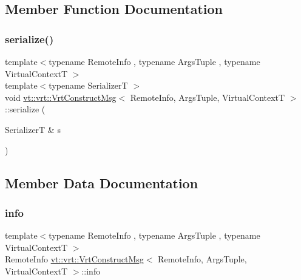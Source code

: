 \subsection{Member Function Documentation}
\mbox{\label{structvt_1_1vrt_1_1_vrt_construct_msg_af6ed1200b682487df4fc1d2faf86aa02}} 
\subsubsection{\texorpdfstring{serialize()}{serialize()}}
{\footnotesize\ttfamily template$<$typename Remote\+Info , typename Args\+Tuple , typename Virtual\+ContextT $>$ \\
template$<$typename SerializerT $>$ \\
void \hyperlink{structvt_1_1vrt_1_1_vrt_construct_msg}{vt\+::vrt\+::\+Vrt\+Construct\+Msg}$<$ Remote\+Info, Args\+Tuple, Virtual\+ContextT $>$\+::serialize (\begin{DoxyParamCaption}\item[{SerializerT \&}]{s }\end{DoxyParamCaption})\hspace{0.3cm}{\ttfamily [inline]}}



\subsection{Member Data Documentation}
\mbox{\label{structvt_1_1vrt_1_1_vrt_construct_msg_a570a118633d088ea4b0cae7e0edfb716}} 
\subsubsection{\texorpdfstring{info}{info}}
{\footnotesize\ttfamily template$<$typename Remote\+Info , typename Args\+Tuple , typename Virtual\+ContextT $>$ \\
Remote\+Info \hyperlink{structvt_1_1vrt_1_1_vrt_construct_msg}{vt\+::vrt\+::\+Vrt\+Construct\+Msg}$<$ Remote\+Info, Args\+Tuple, Virtual\+ContextT $>$\+::info}

